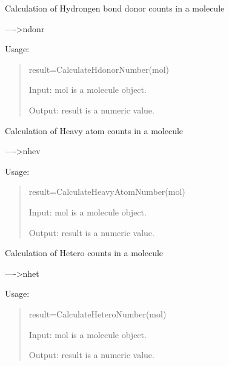 \documentclass[letterpaper,10pt,english]{sphinxmanual}
\begin{document}

\begin{fulllineitems}
\label{reference/constitution:constitution.CalculateHdonorNumber}
Calculation of Hydrongen bond donor counts in a molecule

----\textgreater{}ndonr

Usage:
\begin{quote}

result=CalculateHdonorNumber(mol)

Input: mol is a molecule object.

Output: result is a numeric value.
\end{quote}

\end{fulllineitems}


\begin{fulllineitems}
\label{reference/constitution:constitution.CalculateHeavyAtomNumber}
Calculation of Heavy atom counts in a molecule

----\textgreater{}nhev

Usage:
\begin{quote}

result=CalculateHeavyAtomNumber(mol)

Input: mol is a molecule object.

Output: result is a numeric value.
\end{quote}

\end{fulllineitems}


\begin{fulllineitems}
\label{reference/constitution:constitution.CalculateHeteroNumber}
Calculation of Hetero counts in a molecule

----\textgreater{}nhet

Usage:
\begin{quote}

result=CalculateHeteroNumber(mol)

Input: mol is a molecule object.

Output: result is a numeric value.
\end{quote}

\end{fulllineitems}
\end{document}
